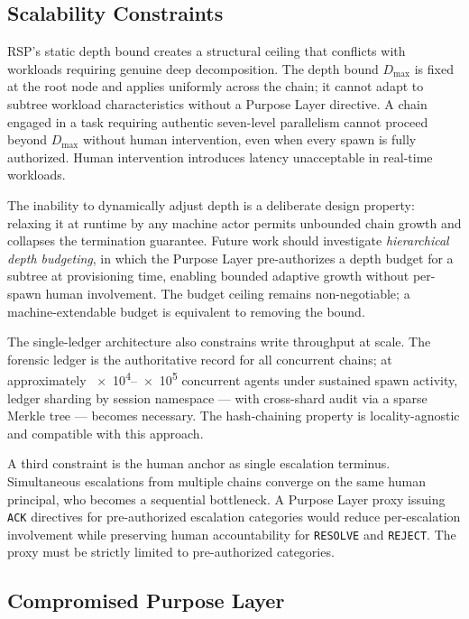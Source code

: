 \subsection{Scalability Constraints}
\label{sec:rs-scalability}

RSP's static depth bound creates a structural ceiling that conflicts with workloads requiring genuine deep decomposition. The depth bound $D_{\max}$ is fixed at the root node and applies uniformly across the chain; it cannot adapt to subtree workload characteristics without a Purpose Layer directive. A chain engaged in a task requiring authentic seven-level parallelism cannot proceed beyond $D_{\max}$ without human intervention, even when every spawn is fully authorized. Human intervention introduces latency unacceptable in real-time workloads.

The inability to dynamically adjust depth is a deliberate design property: relaxing it at runtime by any machine actor permits unbounded chain growth and collapses the termination guarantee. Future work should investigate \emph{hierarchical depth budgeting}, in which the Purpose Layer pre-authorizes a depth budget for a subtree at provisioning time, enabling bounded adaptive growth without per-spawn human involvement. The budget ceiling remains non-negotiable; a machine-extendable budget is equivalent to removing the bound.

The single-ledger architecture also constrains write throughput at scale. The forensic ledger is the authoritative record for all concurrent chains; at approximately \numrange{e4}{e5} concurrent agents under sustained spawn activity, ledger sharding by session namespace — with cross-shard audit via a sparse Merkle tree — becomes necessary. The hash-chaining property is locality-agnostic and compatible with this approach.

A third constraint is the human anchor as single escalation terminus. Simultaneous escalations from multiple chains converge on the same human principal, who becomes a sequential bottleneck. A Purpose Layer proxy issuing \texttt{ACK} directives for pre-authorized escalation categories would reduce per-escalation involvement while preserving human accountability for \texttt{RESOLVE} and \texttt{REJECT}. The proxy must be strictly limited to pre-authorized categories.

\subsection{Compromised Purpose Layer}
\label{sec:rs-purpose-compromise}


